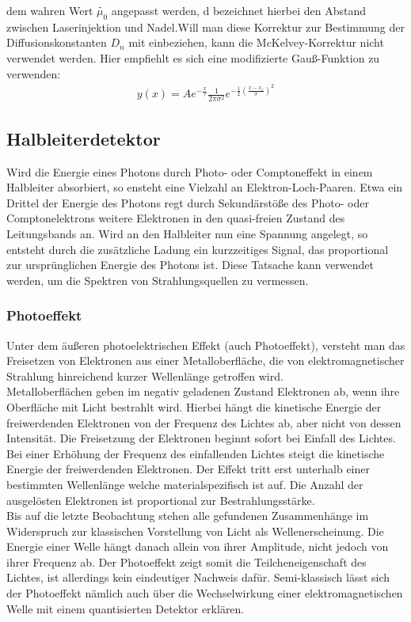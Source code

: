 \documentclass[12pt]{article}
\begin{document}
dem wahren Wert $\tilde{\mu_0}$ angepasst werden, d bezeichnet hierbei den Abstand zwischen
Laserinjektion und Nadel.Will man diese Korrektur zur Bestimmung der Diffusionskonstanten $D_n$ mit einbeziehen, kann die McKelvey-Korrektur nicht verwendet werden. Hier empfiehlt es sich eine modifizierte Gauß-Funktion zu verwenden:
\begin{align}
y(x)=A e^{-\frac{x}{\tau}}\frac{1}{2\pi\sigma^2}e^{-\frac{1}{2}(\frac{x-x_c}{\sigma})^2}
\end{align}

\subsection{Halbleiterdetektor}
Wird die Energie eines Photons durch Photo- oder Comptoneffekt in einem
Halbleiter absorbiert, so ensteht eine Vielzahl an Elektron-Loch-Paaren. Etwa
ein Drittel der Energie des Photons regt durch Sekundärstöße des Photo- oder
Comptonelektrons weitere Elektronen in den quasi-freien Zustand des Leitungsbands an.
 Wird an den Halbleiter nun eine Spannung angelegt, so entsteht durch die zusätzliche Ladung ein kurzzeitiges Signal, das proportional 
zur ursprünglichen Energie des Photons ist. Diese Tatsache kann verwendet werden, um die Spektren von
Strahlungsquellen zu vermessen.

\subsubsection{Photoeffekt}
Unter dem äußeren photoelektrischen Effekt (auch Photoeffekt), versteht man das Freisetzen von Elektronen aus einer Metalloberfläche, die von elektromagnetischer Strahlung hinreichend kurzer Wellenlänge getroffen wird.\\

Metalloberflächen geben im negativ geladenen Zustand Elektronen ab, wenn ihre Oberfläche mit Licht bestrahlt wird. Hierbei hängt die kinetische Energie der freiwerdenden Elektronen von der Frequenz des Lichtes ab, aber nicht von dessen Intensität.
Die Freisetzung der Elektronen beginnt sofort bei Einfall des Lichtes. Bei einer Erhöhung der Frequenz des einfallenden Lichtes steigt die kinetische Energie der freiwerdenden Elektronen. Der Effekt tritt erst unterhalb einer bestimmten Wellenlänge welche materialspezifisch ist auf. Die Anzahl der ausgelösten Elektronen ist proportional zur Bestrahlungsstärke.\\

Bis auf die letzte Beobachtung stehen alle gefundenen Zusammenhänge im Widerspruch zur klassischen Vorstellung von Licht als Wellenerscheinung. Die Energie einer Welle hängt danach allein von ihrer Amplitude, nicht jedoch von ihrer Frequenz ab. Der Photoeffekt zeigt somit die Teilcheneigenschaft des Lichtes, ist allerdings kein eindeutiger Nachweis dafür. Semi-klassisch lässt sich der Photoeffekt nämlich auch über die Wechselwirkung einer elektromagnetischen Welle mit einem quantisierten Detektor erklären.
\end{document}
